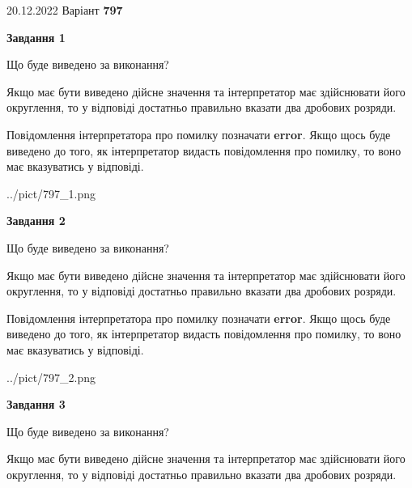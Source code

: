 \documentclass[12pt, ukrainian]{article}
\begin{document}
{20.12.2022 Варіант \No \textbf { 797 }\par}
{
\begin {Large}

{\begin {center}\textbf{Завдання 1}\end {center}}\par
Що буде виведено за виконання? \par

Якщо має бути виведено дійсне значення та інтерпретатор має здійснювати його округлення, 
то у відповіді достатньо правильно вказати два дробових розряди.

Повідомлення інтерпретатора про помилку позначати \textbf{error}.
Якщо щось буде виведено до того, як інтерпретатор видасть повідомлення про помилку, 
то воно має вказуватись у відповіді. \par

\begin{center}
	{../pict/797_1.png}
\end{center}
\newpage

{\begin {center}\textbf{Завдання 2}\end {center}}\par
Що буде виведено за виконання? \par

Якщо має бути виведено дійсне значення та інтерпретатор має здійснювати його округлення, 
то у відповіді достатньо правильно вказати два дробових розряди.

Повідомлення інтерпретатора про помилку позначати \textbf{error}.
Якщо щось буде виведено до того, як інтерпретатор видасть повідомлення про помилку, 
то воно має вказуватись у відповіді. \par

\begin{center}
	{../pict/797_2.png}
\end{center}
\newpage

{\begin {center}\textbf{Завдання 3}\end {center}}\par
Що буде виведено за виконання? \par

Якщо має бути виведено дійсне значення та інтерпретатор має здійснювати його округлення, 
то у відповіді достатньо правильно вказати два дробових розряди.


\end{Large}}
\end{document}
